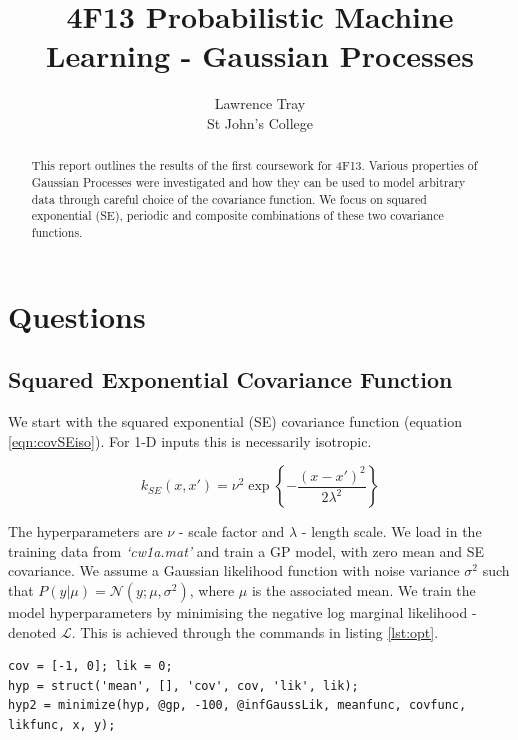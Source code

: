\documentclass[]{article}
\title{4F13 Probabilistic Machine Learning - Gaussian Processes}
\author{Lawrence Tray \\ St John's College}
\newcommand{\Ncal}{\mathcal{N}}
\newcommand{\Lcal}{\mathcal{L}}
\begin{document}


\setcounter{page}{1}
\maketitle

\begin{abstract}
This report outlines the results of the first coursework for 4F13. Various properties of Gaussian Processes were investigated and how they can be used to model arbitrary data through careful choice of the covariance function. We focus on squared exponential (SE), periodic and composite combinations of these two covariance functions.
\end{abstract}

\tableofcontents

\section{Questions}
\subsection{Squared Exponential Covariance Function}

We start with the squared exponential (SE) covariance function (equation \ref{eqn:covSEiso}). For 1-D inputs this is necessarily isotropic.

\begin{equation}
k_{SE}(x, x') = \nu^2 \exp\left\{- \frac{(x-x')^2}{2\lambda^2}\right\}
\label{eqn:covSEiso}
\end{equation}

The hyperparameters are $\nu$ - scale factor and $\lambda$ - length scale. We load in the training data from \textit{`cw1a.mat'} and train a GP model, with zero mean and SE covariance. We assume a Gaussian likelihood function with noise variance $\sigma^2$ such that $P(y|\mu) = \Ncal(y; \mu, \sigma^2)$, where $\mu$ is the associated mean. We train the model hyperparameters by minimising the negative log marginal likelihood - denoted $\Lcal$. This is achieved through the commands in listing \ref{lst:opt}.

\begin{lstlisting}[frame=single, caption={Hyperparameter optimisation}, label={lst:opt}]
cov = [-1, 0]; lik = 0;
hyp = struct('mean', [], 'cov', cov, 'lik', lik);
hyp2 = minimize(hyp, @gp, -100, @infGaussLik, meanfunc, covfunc, likfunc, x, y);
\end{lstlisting}
\end{document}
